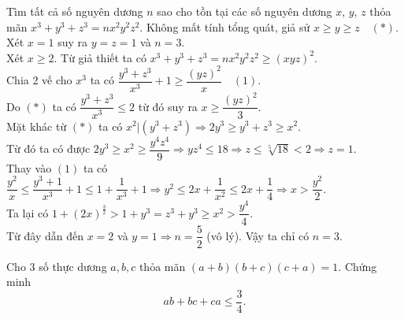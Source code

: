 \begin{ex}%
Tìm tất cả số nguyên dương $n$ sao cho tồn tại các số nguyên dương $x$, $y$, $z$ thỏa mãn $x^3+y^3+z^3 = nx^2y^2z^2$.
\loigiai
	{
		Không mất tính tổng quát, giả sử $x \ge y \ge z\quad (*)$.\\
        Xét $x=1$ suy ra $y=z=1$ và $n=3$.\\
        Xét $x\ge 2$. Từ giả thiết ta có $x^3+y^3+z^3 = nx^2y^2z^2 \ge (xyz)^2$.\\
        Chia 2 vế cho $x^3$ ta có $\dfrac{y^3+z^3}{x^3} + 1 \ge \dfrac{(yz)^2}{x} \quad (1)$.\\
        Do $(*)$ ta có $\dfrac{y^3+z^3}{x^3} \le 2$ từ đó suy ra $x \ge \dfrac{(yz)^2}{3}$.\\
        Mặt khác từ $(*)$ ta có $x^2 |(y^3+z^3) \Rightarrow 2y^3 \geq y^3 + z^3 \geq x^2$.\\
        Từ đó ta có được $2y^3 \geq x^2 \geq \dfrac{y^4z^4}{9} \Rightarrow yz^4 \leq 18 \Rightarrow z \leq \sqrt[5]{18}<2 \Rightarrow z = 1$.\\
        Thay vào $(1)$ ta có $\dfrac{y^2}{x} \leq \dfrac{y^3+1}{x^3}+1  \leq 1 + \dfrac{1}{x^3}+1  \Rightarrow y^2 \leq 2x+\dfrac{1}{x^2}\leq 2x + \dfrac{1}{4} \Rightarrow x > \dfrac{y^2}{2}$.\\
        Ta lại có $1+(2x)^{\frac{3}{2}} > 1+y^3 = z^3 + y^3 \geq x^ 2 > \dfrac{y^4}{4}$.\\
        Từ đây dẫn đến $x=2$ và $y=1\Rightarrow n = \dfrac{5}{2}$ (vô lý). Vậy ta chỉ có $n=3$.
	}
\end{ex}

\begin{ex}
		Cho 3 số thực dương $a,b,c$ thỏa mãn $(a+b)(b+c)(c+a)=1$. Chứng minh $$ab+bc+ca \le \dfrac{3}{4}.$$
\end{ex}

